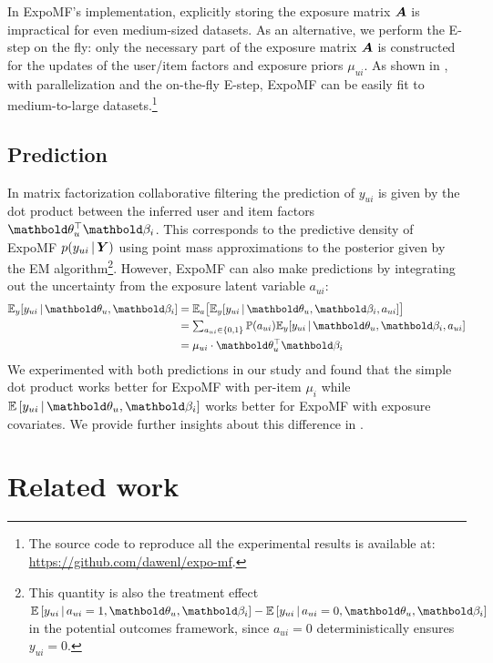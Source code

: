In ExpoMF's implementation, explicitly storing the exposure matrix $\boldsymbol{A}$ is impractical for even medium-sized datasets. As an alternative, we perform the E-step on the fly: only the necessary part of the exposure matrix $\boldsymbol{A}$ is constructed for the updates of the user/item factors and exposure priors $\mu_{ui}$. As shown in , with parallelization and the on-the-fly E-step, ExpoMF can be easily fit to medium-to-large datasets.\footnote{The source code to reproduce all the experimental results is available at: \url{https://github.com/dawenl/expo-mf}.}

\subsection{Prediction} \label{sec:pred}
In matrix factorization collaborative filtering the prediction of $y_{ui}$ is given by the dot product between the inferred user and item factors $\mb\theta_u^\top\mb\beta_i$. This corresponds to the predictive density of ExpoMF $p(y_{ui} \,\vert\, \boldsymbol{Y})$ using point mass approximations  to the posterior given by the EM algorithm\footnote{This quantity is also the treatment effect $\E{y_{ui} \g a_{ui}=1, \mb\theta_u, \mb\beta_i} - \E{y_{ui} \g a_{ui}=0, \mb\theta_u, \mb\beta_i}$ in the potential outcomes framework, since $a_{ui}=0$ deterministically ensures $y_{ui}=0$.}. 
However, ExpoMF can also make predictions by integrating out the uncertainty from the exposure latent variable $a_{ui}$:
\begin{equation}
\begin{split}
\mathbb{E}_y[y_{ui} \g \mb\theta_u, \mb\beta_i] &= \mathbb{E}_a\big[\mathbb{E}_y [y_{ui} \g \mb\theta_u, \mb\beta_i, a_{ui}]\big]\\
&= \textstyle\sum_{a_{ui}\in \{0, 1\}} \mathbb{P}(a_{ui}) \mathbb{E}_y [y_{ui} \g \mb\theta_u, \mb\beta_i, a_{ui}] \\
&= \mu_{ui} \cdot \mb\theta_u^\top\mb\beta_i
\end{split}
\end{equation}
We experimented with both predictions in our study and found that the
simple dot product works better for ExpoMF with per-item $\mu_i$ while
$\E{y_{ui} \g \mb\theta_u, \mb\beta_i}$ works better for ExpoMF with exposure covariates. We provide further insights about this difference in .


\section{Related work}
\label{sec:related_work}


